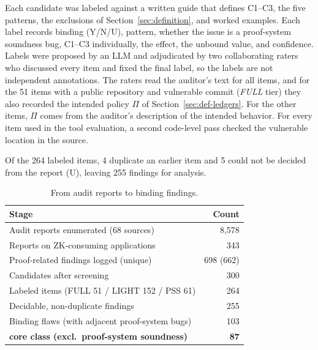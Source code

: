 Each candidate was labeled against a written guide that defines C1--C3, the
five patterns, the exclusions of Section~\ref{sec:definition}, and worked
examples. Each label records binding (Y/N/U), pattern, whether the issue is a
proof-system soundness bug, C1--C3 individually, the effect, the unbound
value, and confidence. Labels were proposed by an LLM and adjudicated by two
collaborating raters who discussed every item and fixed the final label, so
the labels are not independent annotations. The raters read the auditor's
text for all items, and for the 51 items with a public repository and
vulnerable commit (\emph{FULL} tier) they also recorded the intended policy
$\Pi$ of Section~\ref{sec:def-ledgers}. For the other items, $\Pi$ comes
from the auditor's description of the intended behavior. For every item used in the tool evaluation, a second
code-level pass checked the vulnerable location in the source.

Of the 264 labeled items, 4 duplicate an earlier item and 5 could not be
decided from the report (U), leaving 255 findings for analysis.

\begin{table}[t]
\centering
\caption{From audit reports to binding findings.}
\label{tab:funnel}
\footnotesize
\begin{tabular}{@{}lr@{}}
\toprule
\textbf{Stage} & \textbf{Count} \\
\midrule
Audit reports enumerated (68 sources) & 8,578 \\
Reports on ZK-consuming applications & 343 \\
Proof-related findings logged (unique) & 698 (662) \\
Candidates after screening & 300 \\
Labeled items (FULL 51 / LIGHT 152 / PSS 61) & 264 \\
Decidable, non-duplicate findings & 255 \\
Binding flaws (with adjacent proof-system bugs) & 103 \\
\quad \textbf{core class (excl.\ proof-system soundness)} & \textbf{87} \\
\bottomrule
\end{tabular}
\end{table}

